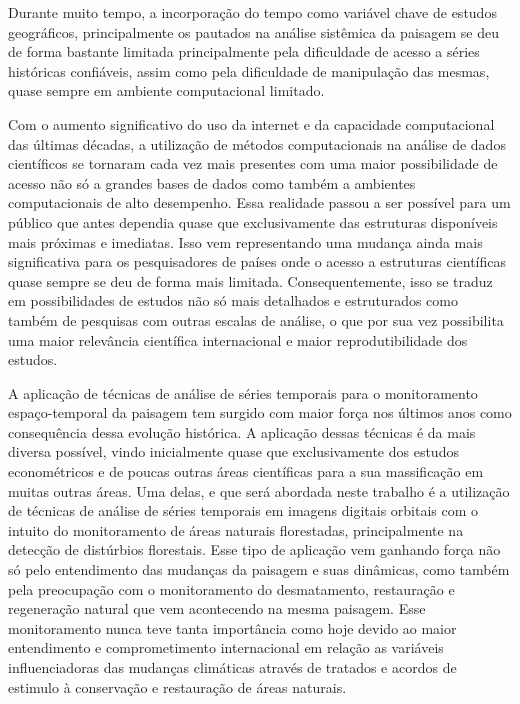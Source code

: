 \documentclass[twocolumn]{article}
\begin{document}
Durante muito tempo, a incorporação do tempo como variável chave de estudos geográficos, principalmente os pautados na análise sistêmica da paisagem se deu de forma bastante limitada principalmente pela dificuldade de acesso a séries históricas confiáveis, assim como pela dificuldade de manipulação das mesmas, quase sempre em ambiente computacional limitado.
\par
Com o aumento significativo do uso da internet e da capacidade computacional das últimas décadas, a utilização de métodos computacionais na análise de dados científicos se tornaram cada vez mais presentes com uma maior possibilidade de acesso não só a grandes bases de dados como também a ambientes computacionais de alto desempenho. Essa realidade passou a ser possível para um público que antes dependia quase que exclusivamente das estruturas disponíveis mais próximas e imediatas. Isso vem representando uma mudança ainda mais significativa para os pesquisadores de países onde o acesso a estruturas científicas quase sempre se deu de forma mais limitada. Consequentemente, isso se traduz em possibilidades de estudos não só mais detalhados e estruturados como também de pesquisas com outras escalas de análise, o que por sua vez possibilita uma maior relevância científica internacional e maior reprodutibilidade dos estudos.
\par
A aplicação de técnicas de análise de séries temporais para o monitoramento espaço-temporal da paisagem tem surgido com maior força nos últimos anos como consequência dessa evolução histórica. A aplicação dessas técnicas é da mais diversa possível, vindo inicialmente quase que exclusivamente dos estudos econométricos e de poucas outras áreas científicas para a sua massificação em muitas outras áreas. Uma delas, e que será abordada neste trabalho é a utilização de técnicas de análise de séries temporais em imagens digitais orbitais com o intuito do monitoramento de áreas naturais florestadas, principalmente na detecção de distúrbios florestais. Esse tipo de aplicação vem ganhando força não só pelo entendimento das mudanças da paisagem e suas dinâmicas, como também pela preocupação com o monitoramento do desmatamento, restauração e regeneração natural que vem acontecendo na mesma paisagem. Esse monitoramento nunca teve tanta importância como hoje devido ao maior entendimento e comprometimento internacional em relação as variáveis influenciadoras das mudanças climáticas através de tratados e acordos de estimulo à conservação e restauração de áreas naturais. 
\par
\end{document}
